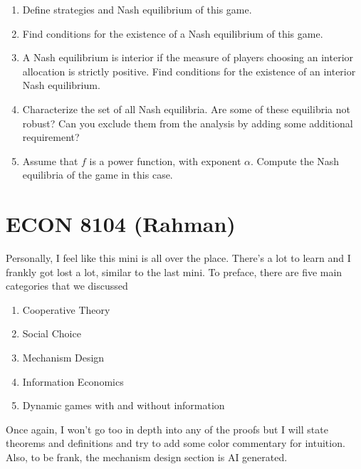 \documentclass[11pt,english]{article}
\begin{document}
\begin{enumerate}
    \item[(1)] Define strategies and Nash equilibrium of this game.
    \begin{solution}
 
    \end{solution}
 
    \item[(2)] Find conditions for the existence of a Nash equilibrium of this
        game.
    \begin{solution}
 
    \end{solution}
 
    \item[(3)] A Nash equilibrium is interior if the measure of players
        choosing an interior allocation is strictly positive. Find conditions
        for the existence of an interior Nash equilibrium.
    \begin{solution}
 
    \end{solution}
 
    \item[(4)] Characterize the set of all Nash equilibria. Are some of these
        equilibria not robust? Can you exclude them from the analysis by adding
        some additional requirement?
    \begin{solution}
 
    \end{solution}
 
    \item[(5)] Assume that $f$ is a power function, with exponent $\alpha$.
        Compute the Nash equilibria of the game in this case.
    \begin{solution}
 
    \end{solution}
\end{enumerate}

\section{ECON 8104 (Rahman)}
Personally, I feel like this mini is all over the place. There's a lot to learn and I frankly got lost a lot, similar to the last mini. To preface, there are five main categories that we discussed
\begin{enumerate}
\item Cooperative Theory
\item Social Choice
\item Mechanism Design
\item Information Economics
\item Dynamic games with and without information
\end{enumerate}
Once again, I won't go too in depth into any of the proofs but I will state theorems and definitions and try to add some color commentary for intuition.  Also, to be frank, the mechanism design section is AI generated.
\end{document}

